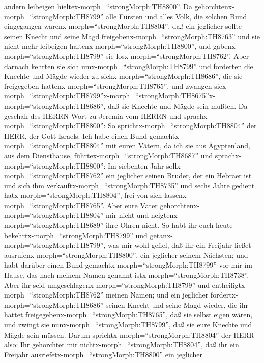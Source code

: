 andern leibeigen hieltex-morph=``strongMorph:TH8800''.  Da
gehorchtenx-morph=``strongMorph:TH8799'' alle Fürsten und alles Volk,
die solchen Bund eingegangen warenx-morph=``strongMorph:TH8804'', daß
ein jeglicher sollte seinen Knecht und seine Magd
freigebenx-morph=``strongMorph:TH8763'' und sie nicht mehr leibeigen
haltenx-morph=``strongMorph:TH8800'', und
gabenx-morph=``strongMorph:TH8799'' sie
losx-morph=``strongMorph:TH8762''.  Aber darnach kehrten
sie sich umx-morph=``strongMorph:TH8799'' und forderten die Knechte und
Mägde wieder zu sichx-morph=``strongMorph:TH8686'', die sie freigegeben
hattenx-morph=``strongMorph:TH8765'', und zwangen
siex-morph=``strongMorph:TH8799''\textbar x-morph=``strongMorph:TH8675''x-morph=``strongMorph:TH8686'',
daß sie Knechte und Mägde sein mußten.  Da geschah des
HERRN Wort zu Jeremia vom HERRN und
sprachx-morph=``strongMorph:TH8800'':  So
sprichtx-morph=``strongMorph:TH8804'' der HERR, der Gott Israels: Ich
habe einen Bund gemachtx-morph=``strongMorph:TH8804'' mit euren Vätern,
da ich sie aus Ägyptenland, aus dem Diensthause,
führtex-morph=``strongMorph:TH8687'' und
sprachx-morph=``strongMorph:TH8800'':  Im siebenten Jahr
sollx-morph=``strongMorph:TH8762'' ein jeglicher seinen Bruder, der ein
Hebräer ist und sich ihm verkauftx-morph=``strongMorph:TH8735'' und
sechs Jahre gedient hatx-morph=``strongMorph:TH8804'', frei von sich
lassenx-morph=``strongMorph:TH8765''. Aber eure Väter
gehorchtenx-morph=``strongMorph:TH8804'' mir nicht und
neigtenx-morph=``strongMorph:TH8689'' ihre Ohren nicht.  So
habt ihr euch heute bekehrtx-morph=``strongMorph:TH8799'' und
getanx-morph=``strongMorph:TH8799'', was mir wohl gefiel, daß ihr ein
Freijahr ließet ausrufenx-morph=``strongMorph:TH8800'', ein jeglicher
seinem Nächsten; und habt darüber einen Bund
gemachtx-morph=``strongMorph:TH8799'' vor mir im Hause, das nach meinem
Namen genannt istx-morph=``strongMorph:TH8738''.  Aber ihr
seid umgeschlagenx-morph=``strongMorph:TH8799'' und
entheiligtx-morph=``strongMorph:TH8762'' meinen Namen; und ein jeglicher
fordertx-morph=``strongMorph:TH8686'' seinen Knecht und seine Magd
wieder, die ihr hattet freigegebenx-morph=``strongMorph:TH8765'', daß
sie selbst eigen wären, und zwingt sie
nunx-morph=``strongMorph:TH8799'', daß sie eure Knechte und Mägde sein
müssen.  Darum sprichtx-morph=``strongMorph:TH8804'' der
HERR also: Ihr gehorchtet mir nichtx-morph=``strongMorph:TH8804'', daß
ihr ein Freijahr ausriefetx-morph=``strongMorph:TH8800'' ein jeglicher
